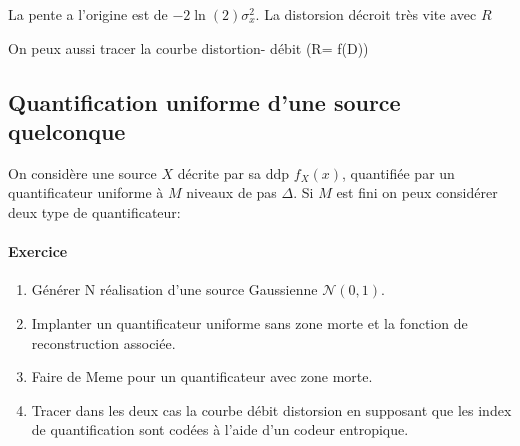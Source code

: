 \documentclass[main.tex]{subfiles}
\begin{document}
\begin{center}
\end{center}
La pente a l'origine est de $-2\ln(2)\sigma_x^2$. La distorsion décroit très vite avec $R$

On peux aussi tracer la courbe distortion- débit (R= f(D))


\subsection{Quantification uniforme d'une source quelconque}

On considère une source $X$ décrite par sa ddp $f_X(x)$, quantifiée par un quantificateur uniforme à $M$ niveaux de pas $\Delta$. Si $M$ est fini on peux considérer deux type de quantificateur:

\paragraph{Exercice}
  \begin{enumerate}
  \item Générer N réalisation d'une source Gaussienne $\mathcal{N}(0,1)$.
  \item Implanter un quantificateur uniforme sans zone morte et la fonction de reconstruction associée.
  \item Faire de Meme pour un quantificateur avec zone morte.
  \item Tracer dans les deux cas la courbe débit distorsion en supposant que les index de quantification sont codées à l'aide d'un codeur entropique.
  \end{enumerate}
\end{document}

